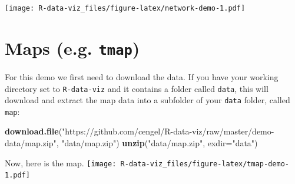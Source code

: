 \documentclass[]{book}
\newenvironment{Shaded}{\begin{snugshade}}{\end{snugshade}}
\newcommand{\KeywordTok}[1]{\textcolor[rgb]{0.13,0.29,0.53}{\textbf{#1}}}
\newcommand{\DataTypeTok}[1]{\textcolor[rgb]{0.13,0.29,0.53}{#1}}
\newcommand{\StringTok}[1]{\textcolor[rgb]{0.31,0.60,0.02}{#1}}
\newcommand{\NormalTok}[1]{#1}
\theoremstyle{definition}
\theoremstyle{definition}
\theoremstyle{definition}
\theoremstyle{remark}
\begin{document}
\texttt{[image: R-data-viz\_files/figure-latex/network-demo-1.pdf]}

\section{\texorpdfstring{Maps (e.g.
\textbf{\texttt{tmap}})}{Maps (e.g. tmap)}}\label{maps-e.g.-tmap}

For this demo we first need to download the data. If you have your
working directory set to \texttt{R-data-viz} and it contains a folder
called \texttt{data}, this will download and extract the map data into a
subfolder of your \texttt{data} folder, called \texttt{map}:

\begin{Shaded}
\begin{Highlighting}[]
\KeywordTok{download.file}\NormalTok{(}\StringTok{"https://github.com/cengel/R-data-viz/raw/master/demo-data/map.zip"}\NormalTok{,}
              \StringTok{"data/map.zip"}\NormalTok{)}
\KeywordTok{unzip}\NormalTok{(}\StringTok{"data/map.zip"}\NormalTok{, }\DataTypeTok{exdir=}\StringTok{"data"}\NormalTok{)}
\end{Highlighting}
\end{Shaded}

Now, here is the map.
\texttt{[image: R-data-viz\_files/figure-latex/tmap-demo-1.pdf]}
\end{document}
